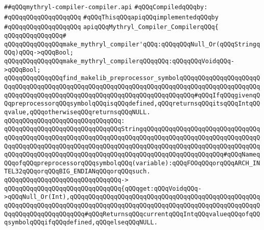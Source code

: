 \label{src/lib/core/internal/mythryl-compiler-compiler.api}
\verb|##qQQqmythryl-compiler-compiler.api|\newline
\newline
\verb|#qQQqCompiledqQQqby:|\newline
\verb|#qQQqqQQqqQQqqQQqqQQq|\newline
\newline
\verb|#qQQqThisqQQqapiqQQqimplementedqQQqby|\newline
\verb|#qQQqqQQqqQQqqQQqqQQq|\newline
\newline
\newline
\verb|apiqQQqMythryl_Compiler_CompilerqQQq{|\newline
\verb|qQQqqQQqqQQqqQQq#|\newline
\verb|qQQqqQQqqQQqqQQqmake_mythryl_compiler'qQQq:qQQqqQQqNull_Or(qQQqStringqQQq)qQQq->qQQqBool;|\newline
\verb|qQQqqQQqqQQqqQQqmake_mythryl_compilerqQQqqQQq:qQQqqQQqVoidqQQq->qQQqBool;|\newline
\newline
\verb|qQQqqQQqqQQqqQQqfind_makelib_preprocessor_symbolqQQqqQQqqQQqqQQqqQQqqQQqqQQqqQQqqQQqqQQqqQQqqQQqqQQqqQQqqQQqqQQqqQQqqQQqqQQqqQQqqQQqqQQqqQQqqQQqqQQqqQQqqQQqqQQqqQQqqQQqqQQqqQQqqQQqqQQqqQQqqQQq#qQQqIfqQQqgivenqQQqpreprocessorqQQqsymbolqQQqisqQQqdefined,qQQqreturnsqQQqitsqQQqIntqQQqvalue,qQQqotherwiseqQQqreturnsqQQqNULL.|\newline
\verb|qQQqqQQqqQQqqQQqqQQqqQQqqQQqqQQq:|\newline
\verb|qQQqqQQqqQQqqQQqqQQqqQQqqQQqqQQqStringqQQqqQQqqQQqqQQqqQQqqQQqqQQqqQQqqQQqqQQqqQQqqQQqqQQqqQQqqQQqqQQqqQQqqQQqqQQqqQQqqQQqqQQqqQQqqQQqqQQqqQQqqQQqqQQqqQQqqQQqqQQqqQQqqQQqqQQqqQQqqQQqqQQqqQQqqQQqqQQqqQQqqQQqqQQqqQQqqQQqqQQqqQQqqQQqqQQqqQQqqQQqqQQqqQQqqQQqqQQqqQQqqQQqqQQq#qQQqNameqQQqofqQQqpreprocessorqQQqsymbolqQQq(variable):qQQqFOOqQQqorqQQqARCH_INTEL32qQQqorqQQqBIG_ENDIANqQQqorqQQqsuch.|\newline
\verb|qQQqqQQqqQQqqQQqqQQqqQQqqQQqqQQq->|\newline
\verb|qQQqqQQqqQQqqQQqqQQqqQQqqQQqqQQq{qQQqget:qQQqVoidqQQq->qQQqNull_Or(Int),qQQqqQQqqQQqqQQqqQQqqQQqqQQqqQQqqQQqqQQqqQQqqQQqqQQqqQQqqQQqqQQqqQQqqQQqqQQqqQQqqQQqqQQqqQQqqQQqqQQqqQQqqQQqqQQqqQQqqQQqqQQqqQQqqQQqqQQqqQQqqQQq#qQQqReturnsqQQqcurrentqQQqIntqQQqvalueqQQqofqQQqsymbolqQQqifqQQqdefined,qQQqelseqQQqNULL.|\newline
